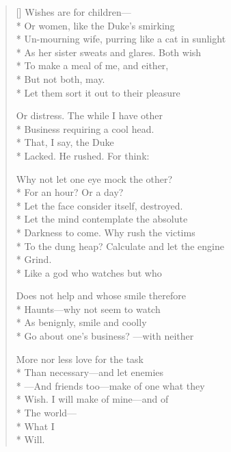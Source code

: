 \label{ch:lear_ay}
\settowidth{\versewidth}{To the dung heap?     Calculate and let the engine}
\begin{verse}[\versewidth]
Wishes are for children---\\*
Or women, like the Duke's smirking\\*
Un-mourning wife, purring like a cat in sunlight\\*
As her sister sweats and glares.     Both wish\\*
To make a meal of me,     and either,\\*
But not both,  may.\\*
Let them sort it out to their pleasure

Or distress.     The while I have other\\*
Business requiring a cool head.\\*
\qquad \qquad \qquad \qquad That, I say, the Duke\\*
Lacked.  He rushed. For think:

Why not let one eye mock the other?\\*
For an hour? Or a day?\\*
Let the face consider itself, destroyed.\\*
Let the mind contemplate the absolute\\*
Darkness to come.     Why rush the victims\\*
To the dung heap?     Calculate and let the engine\\*
Grind.\\*
\qquad Like a god who watches but who

Does not help and whose smile therefore\\*
Haunts---why not seem to watch\\*
As benignly, smile and coolly\\*
Go about one's business?  ---with neither

More nor less love for the task\\*
Than necessary---and let enemies\\*
---And friends too---make of one what they\\*
Wish.   I will make of mine---and of\\*
The world---\\*
What I\\*
Will.
\end{verse}
